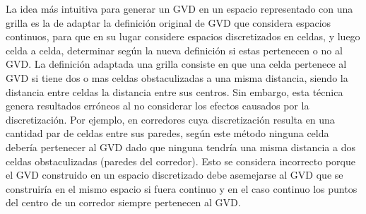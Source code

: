 La idea más intuitiva para generar un GVD en un espacio representado con una grilla es la de adaptar la definición original de GVD que considera espacios continuos, para que en su lugar considere espacios discretizados en celdas, y luego celda a celda, determinar según la nueva definición si estas pertenecen o no al GVD. La definición adaptada una grilla consiste en que una celda pertenece al GVD si tiene dos o mas celdas obstaculizadas a una misma distancia, siendo la distancia entre celdas la distancia entre sus centros. Sin embargo, esta técnica genera resultados erróneos al no considerar los efectos causados por la discretización. Por ejemplo, en corredores cuya discretización resulta en una cantidad par de celdas entre sus paredes, según este método ninguna celda debería pertenecer al GVD dado que ninguna  tendría una misma distancia a dos celdas obstaculizadas (paredes del corredor). Esto se considera incorrecto porque el GVD construido en un espacio discretizado debe asemejarse al GVD que se construiría en el mismo espacio si fuera continuo y  en el caso continuo los puntos del centro de un corredor siempre pertenecen al GVD. %

